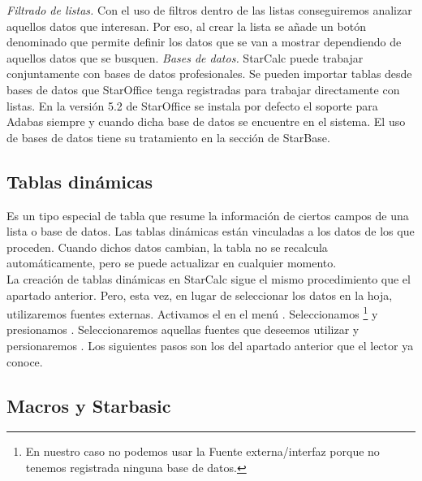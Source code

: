 \emph{Filtrado de listas.}
Con el uso de filtros dentro de las listas conseguiremos analizar aquellos datos
que interesan. Por eso, al crear la lista se añade un botón denominado
 que permite definir los  datos que se van a mostrar dependiendo
de aquellos datos que se busquen.   
\emph{Bases de datos.}
StarCalc puede trabajar conjuntamente con bases de datos profesionales. Se
pueden importar tablas desde bases de datos que StarOffice tenga registradas para trabajar
directamente con listas. En la versión 5.2 de StarOffice se instala por defecto el soporte
para Adabas siempre y cuando dicha base de datos se encuentre en el sistema.
El uso de bases de datos tiene su tratamiento en la sección de StarBase. 
 

\subsection{Tablas dinámicas} 
Es un tipo especial de tabla que resume la información de ciertos campos de
una lista o base de datos. 
Las tablas dinámicas están vinculadas a los datos de los que proceden. Cuando
dichos datos cambian, la tabla no se recalcula automáticamente, pero se puede
actualizar en cualquier momento.\\
La creación de tablas dinámicas en StarCalc sigue el mismo procedimiento que
el apartado anterior. Pero, esta vez, en lugar de seleccionar los datos en
la hoja, utilizaremos fuentes externas. Activamos el 
en el menú . Seleccionamos \footnote{En nuestro caso no podemos usar la Fuente
externa/interfaz porque no tenemos registrada ninguna base de datos.}
y presionamos . Seleccionaremos aquellas fuentes que deseemos
utilizar y persionaremos . Los siguientes pasos son los del
apartado anterior que el lector ya conoce.
\subsection{Macros y Starbasic}  

